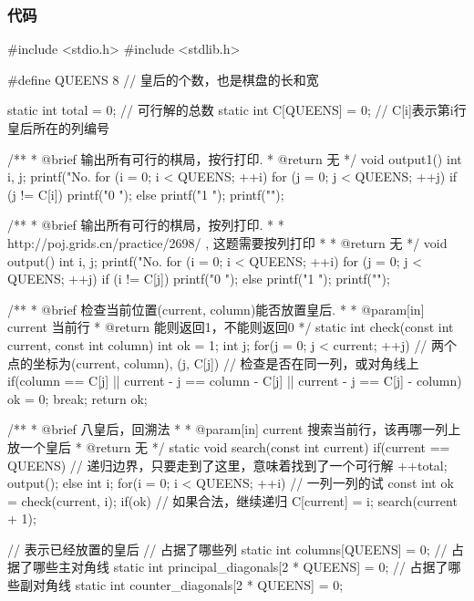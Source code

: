 \subsubsection{代码}
\begin{Codex}[label=eight_queen.c]
#include <stdio.h>
#include <stdlib.h>

#define QUEENS 8 // 皇后的个数，也是棋盘的长和宽

static int total = 0;	// 可行解的总数
static int C[QUEENS] = {0};	// C[i]表示第i行皇后所在的列编号

/** 
 * @brief 输出所有可行的棋局，按行打印.
 * @return 无
 */
void output1() {
    int i, j;
    printf("No. %
    for (i = 0; i < QUEENS; ++i) {
        for (j = 0; j < QUEENS; ++j) {
            if (j != C[i]) {
                printf("0 ");
            } else {
                printf("1 ");
            }
        }
        printf("\n");
    }
}

/** 
 * @brief 输出所有可行的棋局，按列打印.
 *
 * http://poj.grids.cn/practice/2698/ , 这题需要按列打印
 *
 * @return 无
 */
void output() {
    int i, j;
    printf("No. %
    for (i = 0; i < QUEENS; ++i) {
        for (j = 0; j < QUEENS; ++j) {
            if (i != C[j]) {
                printf("0 ");
            } else {
                printf("1 ");
            }
        }
        printf("\n");
    }
}

/** 
 * @brief 检查当前位置(current, column)能否放置皇后.
 *
 * @param[in] current 当前行
 * @return 能则返回1，不能则返回0
 */
static int check(const int current, const int column) {
    int ok = 1;
    int j;
    for(j = 0; j < current; ++j) {
        // 两个点的坐标为(current, column), (j, C[j])
        // 检查是否在同一列，或对角线上
        if(column == C[j] || current - j == column - C[j] || 
            current - j == C[j] - column) {
            ok = 0;
            break;
        }
    }
    return ok;
}

/** 
 * @brief 八皇后，回溯法
 *
 * @param[in] current 搜索当前行，该再哪一列上放一个皇后
 * @return 无
 */
static void search(const int current) {
    if(current == QUEENS) {  // 递归边界，只要走到了这里，意味着找到了一个可行解
        ++total;
        output();
    } else {
        int i;
        for(i = 0; i < QUEENS; ++i) {  // 一列一列的试
            const int ok = check(current, i);
            if(ok) {  // 如果合法，继续递归
                C[current] = i;
                search(current + 1);
            }
        }
    }
}

// 表示已经放置的皇后
// 占据了哪些列
static int columns[QUEENS] = {0};
// 占据了哪些主对角线
static int principal_diagonals[2 * QUEENS] = {0};
// 占据了哪些副对角线
static int counter_diagonals[2 * QUEENS] = {0};


\end{Codex}
